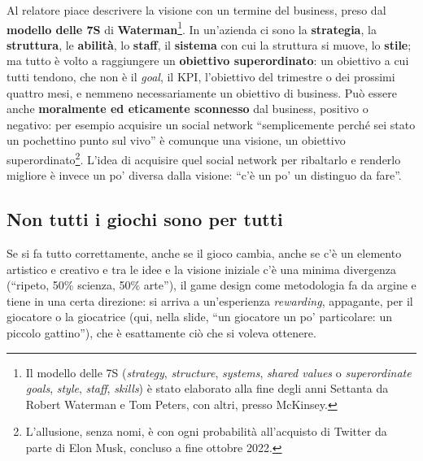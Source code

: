 Al relatore piace descrivere la visione con un termine del business, preso dal
\textbf{modello delle 7S} di \textbf{Waterman}\footnote{Il modello delle 7S
(\emph{strategy}, \emph{structure}, \emph{systems}, \emph{shared values} o
\emph{superordinate goals}, \emph{style}, \emph{staff}, \emph{skills}) è stato
elaborato alla fine degli anni Settanta da Robert Waterman e Tom Peters, con
altri, presso McKinsey.}. In un'azienda ci sono la \textbf{strategia}, la
\textbf{struttura}, le \textbf{abilità}, lo \textbf{staff}, il \textbf{sistema}
con cui la struttura si muove, lo \textbf{stile}; ma tutto è volto a
raggiungere un \textbf{obiettivo superordinato}: un obiettivo a cui tutti
tendono, che non è il \emph{goal}, il KPI, l'obiettivo del trimestre o dei
prossimi quattro mesi, e nemmeno necessariamente un obiettivo di business. Può
essere anche \textbf{moralmente ed eticamente sconnesso} dal business, positivo
o negativo: per esempio acquisire un social network ``semplicemente perché sei
stato un pochettino punto sul vivo'' è comunque una visione, un obiettivo
superordinato\footnote{L'allusione, senza nomi, è con ogni probabilità
all'acquisto di Twitter da parte di Elon Musk, concluso a fine ottobre 2022.}.
L'idea di acquisire quel social network per ribaltarlo e renderlo migliore è
invece un po' diversa dalla visione: ``c'è un po' un distinguo da fare''.

\subsection{Non tutti i giochi sono per tutti}

Se si fa tutto correttamente, anche se il gioco cambia, anche se c'è un elemento
artistico e creativo e tra le idee e la visione iniziale c'è una minima
divergenza (``ripeto, 50\% scienza, 50\% arte''), il game design come metodologia
fa da argine e tiene in una certa direzione: si arriva a un'esperienza
\emph{rewarding}, appagante, per il giocatore o la giocatrice (qui, nella slide,
``un giocatore un po' particolare: un piccolo gattino''), che è esattamente ciò
che si voleva ottenere.

